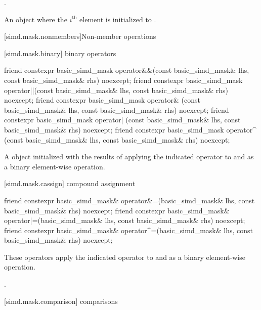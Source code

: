 \begin{itemdescr}
  \pnum\constraints
  .

  \pnum\returns
  An object where the $i^\text{th}$ element is initialized to .
\end{itemdescr}

[simd.mask.nonmembers]{Non-member operations}

[simd.mask.binary]{ binary operators}

\begin{itemdecl}
friend constexpr basic_simd_mask
  operator&&(const basic_simd_mask& lhs, const basic_simd_mask& rhs) noexcept;
friend constexpr basic_simd_mask
  operator||(const basic_simd_mask& lhs, const basic_simd_mask& rhs) noexcept;
friend constexpr basic_simd_mask
  operator& (const basic_simd_mask& lhs, const basic_simd_mask& rhs) noexcept;
friend constexpr basic_simd_mask
  operator| (const basic_simd_mask& lhs, const basic_simd_mask& rhs) noexcept;
friend constexpr basic_simd_mask
  operator^ (const basic_simd_mask& lhs, const basic_simd_mask& rhs) noexcept;
\end{itemdecl}

\begin{itemdescr}
  \pnum\returns
  A  object initialized with the results of applying the indicated operator to  and  as a binary element-wise operation.
\end{itemdescr}

[simd.mask.cassign]{ compound assignment}

\begin{itemdecl}
friend constexpr basic_simd_mask&
  operator&=(basic_simd_mask& lhs, const basic_simd_mask& rhs) noexcept;
friend constexpr basic_simd_mask&
  operator|=(basic_simd_mask& lhs, const basic_simd_mask& rhs) noexcept;
friend constexpr basic_simd_mask&
  operator^=(basic_simd_mask& lhs, const basic_simd_mask& rhs) noexcept;
\end{itemdecl}

\begin{itemdescr}
  \pnum\effects
  These operators apply the indicated operator to  and  as a binary element-wise operation.

  \pnum\returns
  .
\end{itemdescr}

[simd.mask.comparison]{ comparisons}

